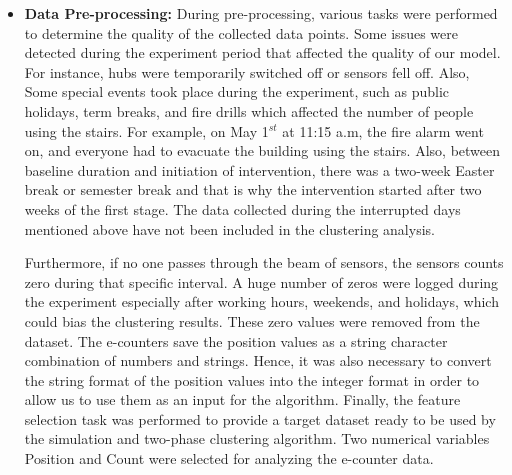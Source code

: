 \begin{itemize}
\item\textbf{Data Pre-processing:}
During pre-processing, various tasks were performed to determine the quality of the collected data points. Some issues were detected during the experiment period that affected the quality of our model. For instance, hubs were temporarily switched off or sensors fell off. Also, Some special events took place during the experiment, such as public holidays, term breaks, and fire drills which affected the number of people using the stairs. For example, on May 1$^{st}$ at 11:15 a.m, the fire alarm went on, and everyone had to evacuate the building using the stairs. Also, between baseline duration and initiation of intervention, there was a two-week Easter break or semester break and that is why the intervention started after two weeks of the first stage. The data collected during the interrupted days mentioned above have not been included in the clustering analysis.

Furthermore, if no one passes through the beam of sensors, the sensors counts zero during that specific interval. A huge number of zeros were logged during the experiment especially after working hours, weekends, and holidays, which could bias the clustering results. These zero values were removed from the dataset. The e-counters save the position values as a string character combination of numbers and strings. Hence, it was also necessary to convert the string format of the position values into the integer format in order to allow us to use them as an input for the algorithm. 
Finally, the feature selection task was performed to provide a target dataset ready to be used by the simulation and two-phase clustering algorithm. Two numerical variables Position and Count were selected for analyzing the e-counter data.%








\end{itemize}
